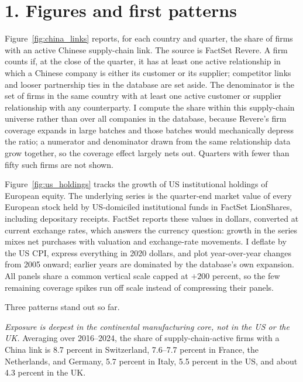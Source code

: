 \documentclass[11pt]{article}
\begin{document}
\section*{1. Figures and first patterns}

Figure~\ref{fig:china_links} reports, for each country and quarter, the share
of firms with an active Chinese supply-chain link. The source is FactSet
Revere. A firm counts if, at the close of the quarter, it has at least one
active relationship in which a Chinese company is either its customer or its
supplier; competitor links and looser partnership ties in the database are set
aside. The denominator is the set of firms in the same country with at least
one active customer or supplier relationship with any counterparty. I compute
the share within this supply-chain universe rather than over all companies in
the database, because Revere's firm coverage expands in large batches and
those batches would mechanically depress the ratio; a numerator and
denominator drawn from the same relationship data grow together, so the
coverage effect largely nets out. Quarters with fewer than fifty such firms
are not shown.

Figure~\ref{fig:us_holdings} tracks the growth of US institutional holdings
of European equity. The underlying series is the quarter-end market value of
every European stock held by US-domiciled institutional funds in FactSet
LionShares, including depositary receipts. FactSet reports these values in
dollars, converted at current exchange rates, which answers the currency
question: growth in the series mixes net purchases with valuation and
exchange-rate movements. I deflate by the US CPI, express everything in 2020
dollars, and plot year-over-year changes from 2005 onward; earlier years are
dominated by the database's own expansion. All panels share a common vertical
scale capped at $+200$ percent, so the few remaining coverage spikes run off
scale instead of compressing their panels.

Three patterns stand out so far.

\emph{Exposure is deepest in the continental manufacturing core, not in the
US or the UK.} Averaging over 2016--2024, the share of supply-chain-active
firms with a China link is 8.7 percent in Switzerland, 7.6--7.7 percent in
France, the Netherlands, and Germany, 5.7 percent in Italy, 5.5 percent in
the US, and about 4.3 percent in the UK.
\end{document}

